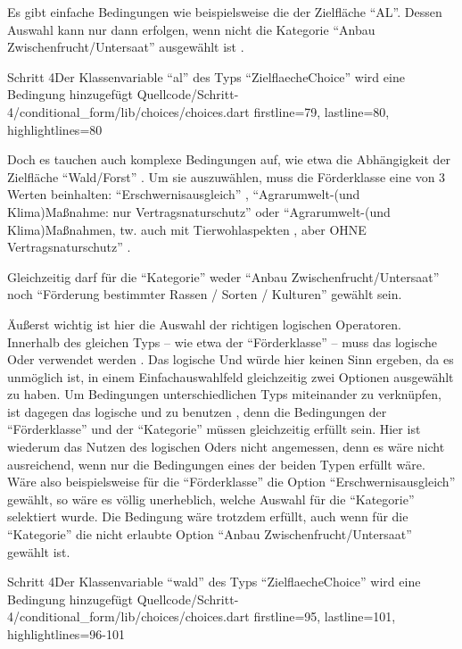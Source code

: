 Es gibt einfache Bedingungen wie beispielsweise die der Zielfläche \enquote{AL}.
Dessen Auswahl kann nur dann erfolgen,
wenn nicht die Kategorie \enquote{Anbau Zwischenfrucht/Untersaat} ausgewählt ist \Lst{\ref{lst:Schritt4al}}.

\begin{alexlisting}{Schritt 4}{Der Klassenvariable \enquote{al} des Typs \enquote{ZielflaecheChoice} wird eine Bedingung hinzugefügt}
  {Quellcode/Schritt-4/conditional_form/lib/choices/choices.dart}
  {firstline=79, lastline=80, highlightlines={80}}
  \label{lst:Schritt4al}
\end{alexlisting}

Doch es tauchen auch komplexe Bedingungen auf,
wie etwa die Abhängigkeit der Zielfläche \enquote{Wald/Forst} \Lst{\ref{lst:Schritt4wald}}.
Um sie auszuwählen,
muss die Förderklasse eine von 3 Werten beinhalten:
\enquote{Erschwernisausgleich} ,
\enquote{Agrarumwelt-(und Klima)Maßnahme: nur Vertragsnaturschutz}  oder
\enquote{Agrarumwelt-(und Klima)Maßnahmen, tw. auch mit Tierwohlaspekten , aber OHNE Vertragsnaturschutz} .

Gleichzeitig darf für die \enquote{Kategorie} weder
\enquote{Anbau Zwischenfrucht/Untersaat} 
noch
\enquote{Förderung bestimmter Rassen / Sorten / Kulturen} 
gewählt sein.

Äußerst wichtig ist hier die Auswahl der richtigen logischen Operatoren.
Innerhalb des gleichen Typs -- wie etwa der \enquote{Förderklasse} -- muss das logische Oder \IC{||} verwendet werden .
Das logische Und würde hier keinen Sinn ergeben,
da es unmöglich ist,
in einem Einfachauswahlfeld gleichzeitig zwei Optionen ausgewählt zu haben.
Um Bedingungen unterschiedlichen Typs miteinander zu verknüpfen,
ist dagegen das logische und \IC{&&} zu benutzen ,
denn die Bedingungen der \enquote{Förderklasse} und der \enquote{Kategorie} müssen gleichzeitig erfüllt sein.
Hier ist wiederum das Nutzen des logischen Oders nicht angemessen,
denn es wäre nicht ausreichend,
wenn nur die Bedingungen eines der beiden Typen erfüllt wäre.
Wäre also beispielsweise für die \enquote{Förderklasse} die Option \enquote{Erschwernisausgleich} gewählt,
so wäre es völlig unerheblich,
welche Auswahl für die \enquote{Kategorie} selektiert wurde.
Die Bedingung wäre trotzdem erfüllt,
auch wenn für die \enquote{Kategorie} die nicht erlaubte Option \enquote{Anbau Zwischenfrucht/Untersaat} gewählt ist.

\begin{alexlisting}{Schritt 4}{Der Klassenvariable \enquote{wald} des Typs \enquote{ZielflaecheChoice} wird eine Bedingung hinzugefügt}
  {Quellcode/Schritt-4/conditional_form/lib/choices/choices.dart}
  {firstline=95, lastline=101, highlightlines={96-101}}
  \label{lst:Schritt4wald}
\end{alexlisting}

